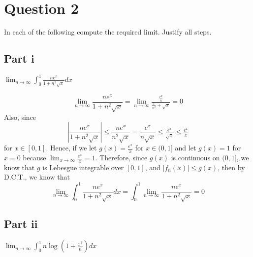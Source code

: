 \section{Question 2}

\begin{question}
   In each of the following compute the required limit. Justify all steps.
\end{question}

\subsection{Part i}

\begin{question}
    $\lim _{n \rightarrow \infty} \int_0^1 \frac{n e^x}{1+n^2 \sqrt{x}} d x$
\end{question}

\begin{answer}
    \begin{equation}
        \lim_{n \to \infty}\frac{n e^x}{1+n^2 \sqrt{x}} = \lim_{n \to \infty} \tfrac{\frac{e^x}{n}}{\frac{1}{n^2} + \sqrt{x}} = 0
    \end{equation}
    Also, since 
    \begin{equation}
        \left\lvert\frac{n e^x}{1+n^2 \sqrt{x}}\right \rvert \leq \frac{n e^x}{n^2 \sqrt{x}} = \frac{e^x}{n \sqrt{x}} \leq \tfrac{e^x}{\sqrt{x}} \leq \tfrac{e^x}{x}
    \end{equation}
    for $x \in [0,1]$. Hence, if we let $g(x) = \tfrac{e^x}{x}$ for $x \in (0,1]$ and let $g(x) = 1$ for $x = 0$ because $\lim_{x \to \infty}\tfrac{e^x}{x} = 1$. Therefore, since $g(x)$ is continuous on $(0,1]$, we know that $g$ is Lebesgue integrable over $[0,1]$, and $\lvert f_n(x)\rvert \leq g(x)$, then by D.C.T., we know that
    \begin{equation}
        \lim _{n \rightarrow \infty} \int_0^1 \frac{n e^x}{1+n^2 \sqrt{x}} d x = \int_0^1 \lim_{n \to \infty}\frac{n e^x}{1+n^2 \sqrt{x}} = 0
    \end{equation}
\end{answer}

\subsection{Part ii}

\begin{question}
    $\lim _{n \rightarrow \infty} \int_0^1 n \log \left(1+\frac{x^3}{n}\right) d x$
\end{question}

